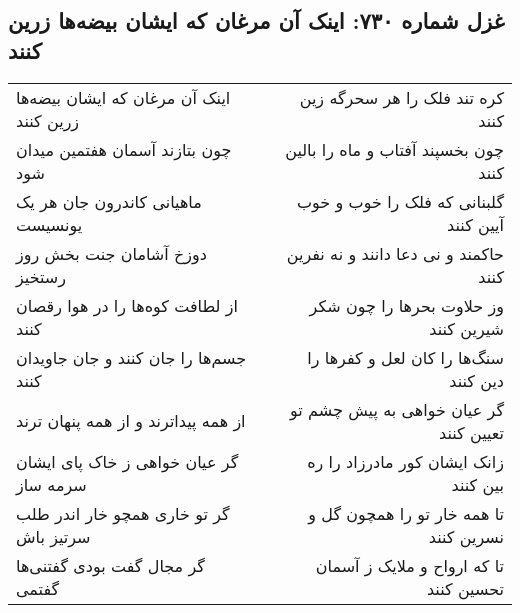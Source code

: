 \begin{center}
\section*{غزل شماره ۷۳۰: اینک آن مرغان که ایشان بیضه‌ها زرین کنند}
\label{sec:0730}
\begin{longtable}{l p{0.5cm} r}
اینک آن مرغان که ایشان بیضه‌ها زرین کنند
&&
کره تند فلک را هر سحرگه زین کنند
\\
چون بتازند آسمان هفتمین میدان شود
&&
چون بخسپند آفتاب و ماه را بالین کنند
\\
ماهیانی کاندرون جان هر یک یونسیست
&&
گلبنانی که فلک را خوب و خوب آیین کنند
\\
دوزخ آشامان جنت بخش روز رستخیز
&&
حاکمند و نی دعا دانند و نه نفرین کنند
\\
از لطافت کوه‌ها را در هوا رقصان کنند
&&
وز حلاوت بحرها را چون شکر شیرین کنند
\\
جسم‌ها را جان کنند و جان جاویدان کنند
&&
سنگ‌ها را کان لعل و کفرها را دین کنند
\\
از همه پیداترند و از همه پنهان ترند
&&
گر عیان خواهی به پیش چشم تو تعیین کنند
\\
گر عیان خواهی ز خاک پای ایشان سرمه ساز
&&
زانک ایشان کور مادرزاد را ره بین کنند
\\
گر تو خاری همچو خار اندر طلب سرتیز باش
&&
تا همه خار تو را همچون گل و نسرین کنند
\\
گر مجال گفت بودی گفتنی‌ها گفتمی
&&
تا که ارواح و ملایک ز آسمان تحسین کنند
\\
\end{longtable}
\end{center}
